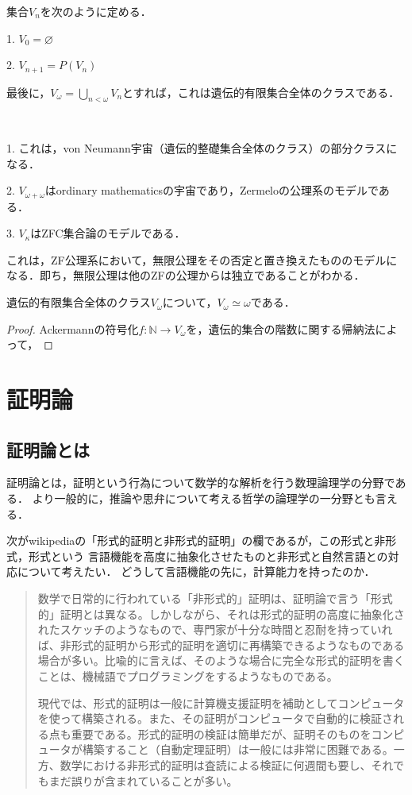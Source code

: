 \documentclass[uplatex, 12pt, dvipdfmx]{jsreport}
\begin{document}
\begin{proposition}[遺伝的有限集合全体のクラス]
    集合$V_n$を次のように定める．

    1. $V_0=\varnothing$

    2. $V_{n+1}=P(V_n)$

    最後に，$V_\omega=\bigcup_{n<\omega}V_n$とすれば，これは遺伝的有限集合全体のクラスである．
\end{proposition}
\begin{remark}　

    1. これは，von Neumann宇宙（遺伝的整礎集合全体のクラス）の部分クラスになる．

    2. $V_{\omega+\omega}$はordinary mathematicsの宇宙であり，Zermeloの公理系のモデルである．

    3. $V_\kappa$はZFC集合論のモデルである．

    これは，ZF公理系において，無限公理をその否定と置き換えたもののモデルになる．即ち，無限公理は他のZFの公理からは独立であることがわかる．
\end{remark}

\begin{proposition}[Ackermann (1937)]
    遺伝的有限集合全体のクラス$V_\omega$について，$V_\omega\simeq\omega$である．
\end{proposition}
\begin{proof}
    Ackermannの符号化$f:\mathbb{N}\to V_\omega$を，遺伝的集合の階数に関する帰納法によって，
\end{proof}

\part{証明論}

\chapter*{証明論とは}

証明論とは，証明という行為について数学的な解析を行う数理論理学の分野である．
より一般的に，推論や思弁について考える哲学の論理学の一分野とも言える．

次がwikipediaの「形式的証明と非形式的証明」の欄であるが，この形式と非形式，形式という
言語機能を高度に抽象化させたものと非形式と自然言語との対応について考えたい．
どうして言語機能の先に，計算能力を持ったのか．
\begin{quotation}
    数学で日常的に行われている「非形式的」証明は、証明論で言う「形式的」証明とは異なる。しかしながら、それは形式的証明の高度に抽象化されたスケッチのようなもので、専門家が十分な時間と忍耐を持っていれば、非形式的証明から形式的証明を適切に再構築できるようなものである場合が多い。比喩的に言えば、そのような場合に完全な形式的証明を書くことは、機械語でプログラミングをするようなものである。

    現代では、形式的証明は一般に計算機支援証明を補助としてコンピュータを使って構築される。また、その証明がコンピュータで自動的に検証される点も重要である。形式的証明の検証は簡単だが、証明そのものをコンピュータが構築すること（自動定理証明）は一般には非常に困難である。一方、数学における非形式的証明は査読による検証に何週間も要し、それでもまだ誤りが含まれていることが多い。
\end{quotation}
\end{document}
